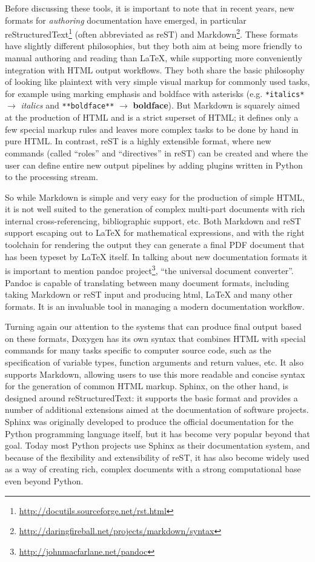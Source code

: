 \documentclass[ChapterTOCs,krantz2]{krantz} %
\begin{document}
Before discussing these tools, it is important to note that in recent years,
new formats for \emph{authoring} documentation have emerged, in particular
reStructuredText\footnote{\url{http://docutils.sourceforge.net/rst.html}}
(often abbreviated as reST) and
Markdown\footnote{\url{http://daringfireball.net/projects/markdown/syntax}}.
These formats have slightly different philosophies, but they both aim at being
more friendly to manual authoring and reading than \LaTeX{}, while supporting
more conveniently integration with HTML output workflows.  They both share the
basic philosophy of looking like plaintext with very simple visual markup for
commonly used tasks, for example using marking emphasis and boldface with
asterisks (e.g. \texttt{*italics*} $\rightarrow$ \emph{italics} and
\texttt{**boldface**} $\rightarrow$ \textbf{boldface}).  But Markdown is
squarely aimed at the production of HTML and is a strict superset of HTML; it
defines only a few special markup rules and leaves more complex tasks to be
done by hand in pure HTML.  In contrast, reST is a highly extensible format,
where new commands (called ``roles'' and ``directives'' in reST) can be created
and where the user can define entire new output pipelines by adding plugins
written in Python to the processing stream.

So while Markdown is simple and very easy for the production of simple HTML, it
is not well suited to the generation of complex multi-part documents with rich
internal cross-referencing, bibliographic support, etc.  Both Markdown and reST
support escaping out to \LaTeX{} for mathematical expressions, and with the
right toolchain for rendering the output they can generate a final PDF document
that has been typeset by \LaTeX{} itself.  In talking about new documentation
formats it is important to mention pandoc
project\footnote{\url{http://johnmacfarlane.net/pandoc}}, ``the universal
document converter''. Pandoc is capable of translating between many document
formats, including taking Markdown or reST input and producing html, \LaTeX{}
and many other formats.  It is an invaluable tool in managing a modern
documentation workflow.

Turning again our attention to the systems that can produce final output based
on these formats, Doxygen has its own syntax that combines HTML with special
commands for many tasks specific to computer source code, such as the
specification of variable types, function arguments and return values, etc.  It
also supports Markdown, allowing users to use this more readable and concise
syntax for the generation of common HTML markup.  Sphinx, on the other hand, is
designed around reStructuredText: it supports the basic format and provides a
number of additional extensions aimed at the documentation of software
projects. Sphinx was originally developed to produce the official documentation
for the Python programming language itself, but it has become very popular
beyond that goal.  Today most Python projects use Sphinx as their documentation
system, and because of the flexibility and extensibility of reST, it has also
become widely used as a way of creating rich, complex documents with a strong
computational base even beyond Python.
\end{document}
